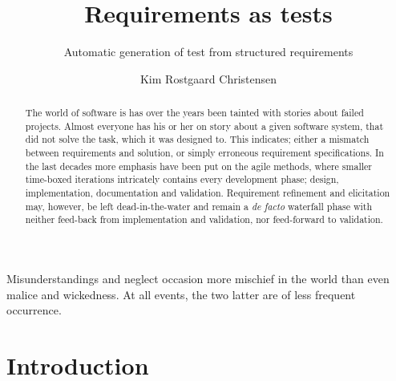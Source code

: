 \documentclass[10pt]{scrreprt}
\author{Kim Rostgaard Christensen}
\title{Requirements as tests}
\subtitle{Automatic generation of test from structured requirements}
\begin{document}
\maketitle
 
\tableofcontents
\newpage

\begin{fquote}Misunderstandings and neglect occasion more mischief in the world than even malice and wickedness. At all events, the two latter are of less frequent occurrence.
\end{fquote}
\begin{abstract}
The world of software is has over the years been tainted with stories about failed projects. Almost everyone has his or her on story about a given software system, that did not solve the task, which it was designed to. This indicates; either a mismatch between requirements and solution, or simply erroneous requirement specifications. In the last decades more emphasis have been put on the agile methods, where smaller time-boxed iterations intricately contains every development phase; design, implementation, documentation and validation. Requirement refinement and elicitation may, however, be left dead-in-the-water and remain a \emph{de facto} waterfall phase with neither feed-back from implementation and validation, nor feed-forward to validation.
\end{abstract}

\chapter{Introduction}

\end{document}
